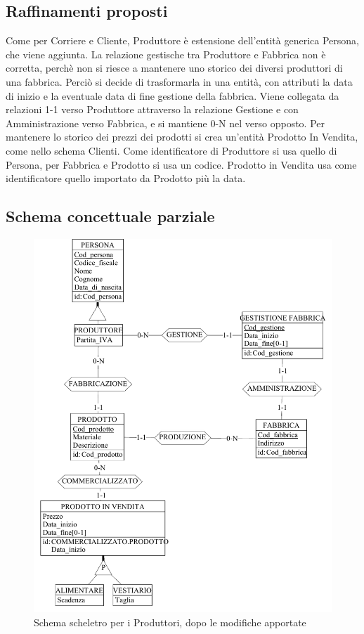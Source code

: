 \documentclass[a4paper,12pt]{report}
\begin{document}
\subsection{Raffinamenti proposti}
Come per Corriere e Cliente, Produttore è estensione dell'entità generica Persona, che viene aggiunta. 
La relazione gestische tra Produttore e Fabbrica non è corretta, perchè non si riesce a mantenere uno storico dei diversi produttori di una fabbrica.
Perciò si decide di trasformarla in una entità, con attributi la data di inizio e la eventuale data di fine gestione della fabbrica. Viene collegata da relazioni 1-1 verso Produttore attraverso la relazione Gestione e con Amministrazione verso Fabbrica, e si mantiene 0-N nel verso opposto.
Per mantenere lo storico dei prezzi dei prodotti si crea un'entità Prodotto In Vendita, come nello schema Clienti.
Come identificatore di Produttore si usa quello di Persona, per Fabbrica e Prodotto si usa un codice. Prodotto in Vendita usa come identificatore quello importato da Prodotto più la data.
\subsection{Schema concettuale parziale}
\begin{figure}[H]
	\centering{}
	\includegraphics[width=\textwidth]{img/SchemaConcettuale-Produttori2.pdf}
	\caption{Schema scheletro per i Produttori, dopo le modifiche apportate}
\end{figure}
\end{document}
